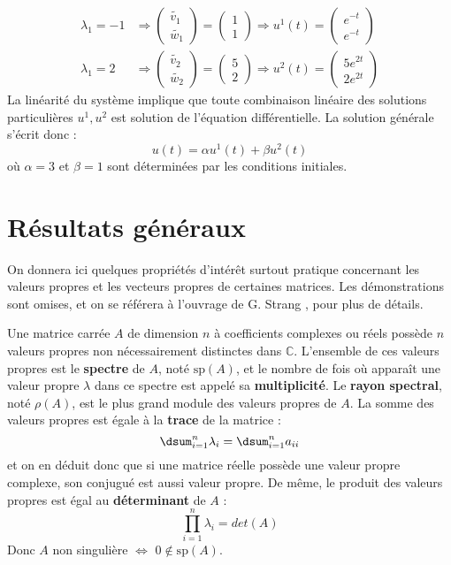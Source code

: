 \begin{align*}
\lambda_1=-1 & \Rightarrow \begin{pmatrix}\tilde{v_1}\\\tilde{w_1}\end {pmatrix}=\begin{pmatrix}1\\1\end {pmatrix} \Rightarrow u^1(t)=\begin{pmatrix}e^{-t}\\e^{-t}\end {pmatrix}\\
\lambda_1=2 & \Rightarrow \begin{pmatrix}\tilde{v_2}\\\tilde{w_2}\end {pmatrix}=\begin{pmatrix}5\\2\end {pmatrix} \Rightarrow u^2(t)=\begin{pmatrix}5e^{2t}\\2e^{2t}\end {pmatrix}
\end{align*}
La linéarité du système implique que toute combinaison linéaire des solutions particulières $u^1,u^2$ est solution de l'équation différentielle. La solution générale s'écrit donc :
$$u(t)=\alpha u^1(t)+\beta u^2(t)$$
où $\alpha=3$ et $\beta=1$ sont déterminées par les conditions initiales.

\section{Résultats généraux} %

On donnera ici quelques propriétés d'intérêt surtout pratique concernant les valeurs propres et les vecteurs propres de certaines matrices. Les démonstrations sont omises, et on se référera à l'ouvrage de G. Strang \cite{SG:88}, pour plus de détails.

Une matrice carrée $A$ de dimension $n$ à coefficients complexes ou réels possède $n$ valeurs 
propres non nécessairement distinctes dans $\mathbb{C}$. L'ensemble de ces valeurs propres est 
le \textbf{spectre}  de $A$, noté $\mathrm{sp}(A)$, et le nombre de fois où apparaît une 
valeur propre $\lambda$ dans ce spectre est appelé sa 
\textbf{multiplicité}.
Le \textbf{rayon spectral}, noté $\rho(A)$, est le plus grand module des valeurs propres de $A$. La somme des valeurs propres est égale à la \textbf{trace} 
 de la matrice :
$$
\dsum_{i=1}^n\lambda_i=\dsum_{i=1}^na_{ii}
$$
et on en déduit donc que si une matrice réelle possède une valeur propre complexe, son conjugué est aussi valeur propre. De même, le produit des valeurs propres est égal au \textbf{déterminant}
  de 
$A$ :
$$
\prod_{i=1}^n\lambda_i=det(A)
$$
Donc $A$ non singulière $\Leftrightarrow$ $0\notin \mathrm{sp}(A)$.

